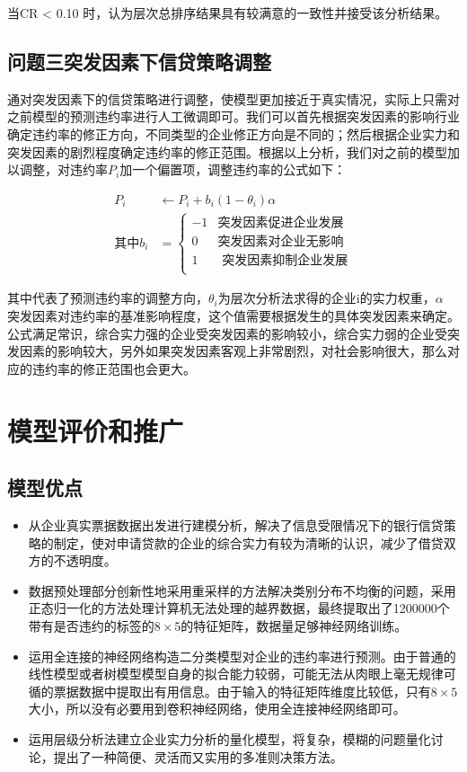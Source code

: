 \documentclass{cumcmthesis}
\begin{document}
当CR < 0.10 时，认为层次总排序结果具有较满意的一致性并接受该分析结果。 

\subsection{问题三突发因素下信贷策略调整}
通对突发因素下的信贷策略进行调整，使模型更加接近于真实情况，实际上只需对之前模型的预测违约率进行人工微调即可。我们可以首先根据突发因素的影响行业确定违约率的修正方向，不同类型的企业修正方向是不同的；然后根据企业实力和突发因素的剧烈程度确定违约率的修正范围。根据以上分析，我们对之前的模型加以调整，对违约率$P_i$加一个偏置项，调整违约率的公式如下：

\begin{equation}
    \begin{split}
         P_i &\gets  P_i + b_i \left(1-\theta_i \right) \alpha \\
        \mbox{其中} b_i & = 
        \begin{cases}
            -1 & \mbox{突发因素促进企业发展} \\
            0 & \mbox{突发因素对企业无影响} \\
            1 &\mbox{ 突发因素抑制企业发展} \\
        \end{cases}
    \end{split}
\end{equation}

其中代表了预测违约率的调整方向，$\theta_i$为层次分析法求得的企业i的实力权重，$\alpha$ 突发因素对违约率的基准影响程度，这个值需要根据发生的具体突发因素来确定。公式满足常识，综合实力强的企业受突发因素的影响较小，综合实力弱的企业受突发因素的影响较大，另外如果突发因素客观上非常剧烈，对社会影响很大，那么对应的违约率的修正范围也会更大。



\section{模型评价和推广}
\subsection{模型优点}
\begin{itemize}
    \item 从企业真实票据数据出发进行建模分析，解决了信息受限情况下的银行信贷策略的制定，使对申请贷款的企业的综合实力有较为清晰的认识，减少了借贷双方的不透明度。
    \item 数据预处理部分创新性地采用重采样的方法解决类别分布不均衡的问题，采用正态归一化的方法处理计算机无法处理的越界数据，最终提取出了1200000个带有是否违约的标签的$8 \times 5$的特征矩阵，数据量足够神经网络训练。
    \item 运用全连接的神经网络构造二分类模型对企业的违约率进行预测。由于普通的线性模型或者树模型模型自身的拟合能力较弱，可能无法从肉眼上毫无规律可循的票据数据中提取出有用信息。由于输入的特征矩阵维度比较低，只有$8 \times 5$大小，所以没有必要用到卷积神经网络，使用全连接神经网络即可。
    \item 运用层级分析法建立企业实力分析的量化模型，将复杂，模糊的问题量化讨论，提出了一种简便、灵活而又实用的多准则决策方法。
\end{itemize}
\end{document}
